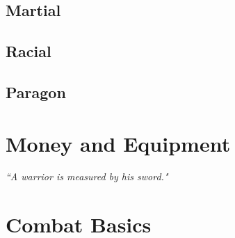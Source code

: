 \documentclass[10pt]{report}
\newcommand{\quot}[1]{\emph{#1}\medskip}
\begin{document}
\section{Martial}






















\section{Racial}




\section{Paragon}






\chapter{Money and Equipment}
\vspace*{-36pt}
\begin{flushright}\quot{``A warrior is measured by his sword."} \end{flushright}






\chapter{Combat Basics}




\end{document}
